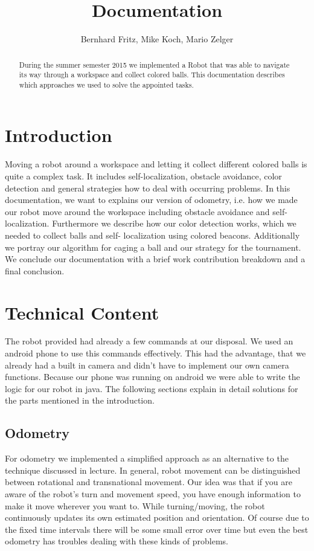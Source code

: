 \documentclass[703030]{./includes/iisreport}
\title{Documentation}
\author{Bernhard Fritz, Mike Koch, Mario Zelger}
\begin{document}
\maketitle

\begin{abstract}
\noindent During the summer semester 2015 we implemented a Robot that was able to navigate its way through a 
workspace and collect colored balls. This documentation describes which approaches we used to solve
the appointed tasks.

\end{abstract}

\section{Introduction}

Moving a robot around a workspace and letting it collect different colored balls is quite a complex
task. It includes self-localization, obstacle avoidance, color detection and general strategies how
to deal with occurring problems. In this documentation, we want to explains our version of odometry, 
i.e. how we made our robot move around the workspace including obstacle avoidance and self-localization.
Furthermore we describe how our color detection works, which we needed to collect balls and self-
localization using colored beacons. Additionally we portray our algorithm for caging a ball and our
strategy for the tournament. We conclude our documentation with a brief work contribution breakdown 
and a final conclusion.

\section{Technical Content}

The robot provided had already a few commands at our disposal. We used an android phone to use this
commands effectively. This had the advantage, that we already had a built in camera and didn't have 
to implement our own camera functions. Because our phone was running on android we were able to write 
the logic for our robot in java. The following sections explain in detail solutions for the parts 
mentioned in the introduction.

\subsection{Odometry}
For odometry we implemented a simplified approach as an alternative to the 
technique discussed in lecture. In general, robot movement can be distinguished 
between rotational and transnational movement. Our idea was that if you are aware
of the robot's turn and movement speed, you have enough information to make it 
move wherever you want to. While turning/moving, the robot continuously updates its 
own estimated position and orientation. Of course due to the fixed time intervals 
there will be some small error over time but even the best odometry has troubles 
dealing with these kinds of problems.
\end{document}
